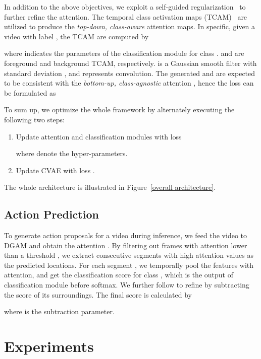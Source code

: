 \documentclass[10pt,twocolumn,letterpaper]{article}
\begin{document}
In addition to the above objectives, we exploit a self-guided regularization~\cite{nguyen2019weakly} to further refine the attention.
The temporal class activation maps (TCAM)~\cite{nguyen2018weakly,zhou2016learning} are utilized to produce the \emph{top-down, class-aware} attention maps.
In specific, given a video with label , the TCAM are computed by

where  indicates the parameters of the classification module for class .  and  are foreground and background TCAM, respectively.
 is a Gaussian smooth filter with standard deviation , and  represents convolution.
The generated  and  are expected to be consistent with the \emph{bottom-up, class-agnostic} attention , hence the loss  can be formulated as



To sum up, we optimize the whole framework by alternately executing the following two steps:
\begin{enumerate}
    \item Update attention and classification modules with loss
    
    where  denote the hyper-parameters.
    \item Update CVAE with loss .
\end{enumerate}
The whole architecture is illustrated in Figure~\ref{overall architecture}.




\subsection{Action Prediction}

To generate action proposals for a video during inference, we feed the video to DGAM and obtain the attention .
By filtering out frames with attention lower than a threshold , we extract consecutive segments with high attention values as the predicted locations.
For each segment , we temporally pool the features with attention, and get the classification score  for class , which is the output of classification module before softmax.
We further follow \cite{shou2018autoloc, liu2019completeness} to refine  by subtracting the score of its surroundings. The final score  is calculated by

where  is the subtraction parameter.




\section{Experiments}
\end{document}
